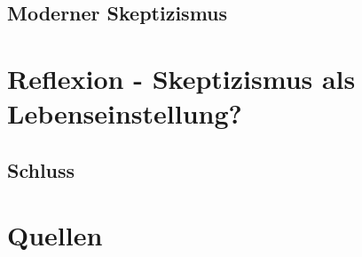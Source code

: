 \documentclass[12pt,a4paper]{article}
\begin{document}
	\subsection{Moderner Skeptizismus}
\section{Reflexion - Skeptizismus als Lebenseinstellung?}
	\subsection{Schluss}


\section*{Quellen}
\end{document}
